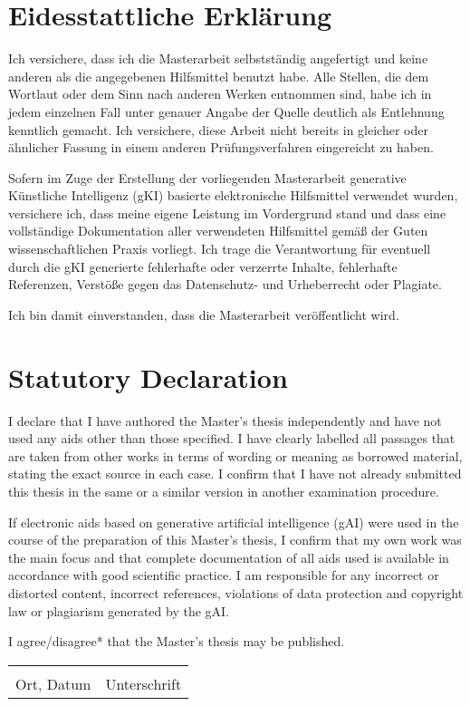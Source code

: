 \documentclass{scrreport}
\begin{document}
\section*{Eidesstattliche Erklärung}

Ich versichere, dass ich die Masterarbeit selbstständig angefertigt und keine anderen als die angegebenen Hilfsmittel benutzt habe.
Alle Stellen, die dem Wortlaut oder dem Sinn nach anderen Werken entnommen sind, habe ich in jedem einzelnen Fall unter genauer Angabe der Quelle deutlich als Entlehnung kenntlich gemacht. 
Ich versichere, diese Arbeit nicht bereits in gleicher oder ähnlicher Fassung in einem anderen Prüfungsverfahren eingereicht zu haben.

Sofern im Zuge der Erstellung der vorliegenden Masterarbeit generative Künstliche Intelligenz (gKI) basierte elektronische Hilfsmittel verwendet wurden, versichere ich, dass meine eigene Leistung im Vordergrund stand und dass eine vollständige Dokumentation aller verwendeten Hilfsmittel gemäß der Guten
wissenschaftlichen Praxis vorliegt.
Ich trage die Verantwortung für eventuell durch die gKI generierte fehlerhafte oder verzerrte Inhalte, fehlerhafte Referenzen, Verstöße gegen das Datenschutz- und Urheberrecht oder Plagiate.

Ich bin damit einverstanden, dass die Masterarbeit veröffentlicht wird.


\section*{\textcolor{UHHgray}{Statutory Declaration}}

{\color{UHHgray}
I declare that I have authored the Master's thesis independently and have not used any aids other than those specified.
I have clearly labelled all passages that are taken from other works in terms of wording or meaning as borrowed material, stating the exact source in each case.
I confirm that I have not already submitted this thesis in the same or a similar version in another examination procedure.

If electronic aids based on generative artificial intelligence (gAI) were used in the course of the preparation of this Master's thesis, I confirm that my own work was the main focus and that complete documentation of all aids used is available in accordance with good scientific practice.
I am responsible for any incorrect or distorted content, incorrect references, violations of data protection and copyright law or plagiarism generated by the gAI.

I agree/disagree* that the Master's thesis may be published.

}

\vspace{2cm}

\begin{tabular}{@{}p{}p{8cm}@{}}
    \hrulefill & \hrulefill \\
    Ort, Datum & Unterschrift \\
\end{tabular}
    
\end{document}
